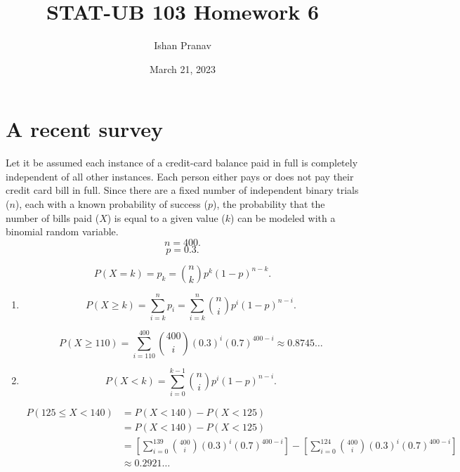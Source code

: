 \documentclass[12pt]{article}
\title{STAT-UB 103 Homework 6}
\author{Ishan Pranav}
\date{March 21, 2023}
\begin{document}
\maketitle
\section{A recent survey}
Let it be assumed each instance of a credit-card balance paid in full is completely independent of all other instances. Each person either pays or does not pay their credit card bill in full. Since there are a fixed number of independent binary trials ($n$), each with a known probability of success ($p$), the probability that the number of bills paid ($X$) is equal to a given value ($k$) can be modeled with a binomial random variable. 
\[n=400.\]
\[p=0.3.\]

\[P(X=k)=p_k={\binom{n}{k}}p^k(1-p)^{n-k}.\]

\begin{enumerate}
\item
\[P(X\geq k)=\sum^{n}_{i=k}{p_i}=\sum^{n}_{i=k}{{\binom{n}{i}}p^i(1-p)^{n-i}}.\]

\[P(X\geq 110)=\sum^{400}_{i=110}{{\binom{400}{i}}(0.3)^i(0.7)^{400-i}}\approx 0.8745\dots\]
\item\[P(X<k)=\sum^{k-1}_{i=0}{\binom{n}{i}p^i(1-p)^{n-i}}.\]

\begin{align}
P(125\leq X<140)
&=P(X<140)-P(X<125)\\
&=P(X<140)-P(X<125)\\
&=\left[\sum^{139}_{i=0}{\binom{400}{i}(0.3)^i(0.7)^{400-i}}\right]-\left[\sum^{124}_{i=0}{\binom{400}{i}(0.3)^i(0.7)^{400-i}}\right]\\
&\approx 0.2921\dots
\end{align}
\end{enumerate}
\end{document}
